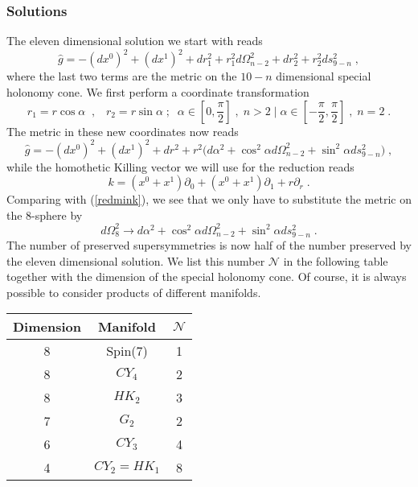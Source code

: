 \documentclass[a4paper,12pt]{article}
\newcommand{\ft}[2]{{\textstyle\frac{#1}{#2}}}
\begin{document}
\subsubsection{Solutions}
The eleven dimensional solution we start with reads
\begin{equation}
\hat{g}=-(dx^0)^2+(dx^1)^2+dr_1^2+r_1^2d\Omega_{n-2}^2+dr_2^2+r_2^2 ds_{9-n}^2\; ,
\end{equation}
where the last two terms are the metric on the $10-n$ dimensional special holonomy cone. We first perform a coordinate transformation
\begin{equation}
r_1=r \cos \alpha \; \; , \; \; \; r_2=r\sin \alpha \; ; \; \; \alpha \in [0,\ft{\pi}2] \; , \; n>2 \; | \;\alpha \in [-\ft{\pi}2,\ft{\pi}2] \; , \; n=2 \; .
\end{equation}
The metric in these new coordinates now reads
\begin{equation}
\hat{g}=-(dx^0)^2+(dx^1)^2+dr^2+r^2 \Big(d\alpha^2 + \cos^2 \alpha d\Omega_{n-2}^2+\sin^2 \alpha ds_{9-n}^2\Big)\; ,
\end{equation}
while the homothetic Killing vector we will use for the reduction reads
\begin{equation}
k=(x^0+x^1)\partial_0+(x^0+x^1)\partial_1+r\partial_r\; .
\end{equation}
Comparing with (\ref{redmink}), we see that we only have to substitute the metric on the 8-sphere by
\begin{equation}
d\Omega_8^2 \to  d\alpha^2 + \cos^2 \alpha d\Omega_{n-2}^2+\sin^2 \alpha ds_{9-n}^2\; .
\end{equation}
The number of preserved supersymmetries is now half of the number preserved by the eleven dimensional solution.
We list this number $\mathcal{N}$ in the following table together with the dimension of the special holonomy cone. Of course, it is always possible to
consider products of different manifolds.
\begin{center}
\begin{tabular}[t]{|c|c|c|}
\hline
Dimension&Manifold& $\mathcal{N}$\\
\hline \hline
8&Spin(7)&1\\
8&$CY_4$&2\\
8&$HK_2$&3\\
7&$G_2$&2\\
6&$CY_3$&4\\
4&$CY_2= HK_1$&8\\
\hline
\end{tabular}
\end{center}
\end{document}
